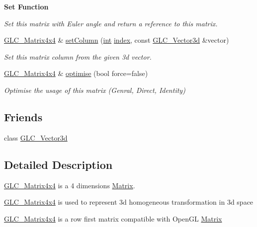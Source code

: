 \begin{Indent}{\bf Set Function}
\begin{DoxyCompactItemize}
\begin{DoxyCompactList}\small\item\em Set this matrix with Euler angle and return a reference to this matrix. \end{DoxyCompactList}\item 
\hyperlink{class_g_l_c___matrix4x4}{G\-L\-C\-\_\-\-Matrix4x4} \& \hyperlink{class_g_l_c___matrix4x4_ac3c938835da031e19b26eb27a5e436c1}{set\-Column} (\hyperlink{ioapi_8h_a787fa3cf048117ba7123753c1e74fcd6}{int} \hyperlink{glext_8h_ab47dd9958bcadea08866b42bf358e95e}{index}, const \hyperlink{class_g_l_c___vector3d}{G\-L\-C\-\_\-\-Vector3d} \&vector)
\begin{DoxyCompactList}\small\item\em Set this matrix column from the given 3d vector. \end{DoxyCompactList}\item 
\hyperlink{class_g_l_c___matrix4x4}{G\-L\-C\-\_\-\-Matrix4x4} \& \hyperlink{class_g_l_c___matrix4x4_a377e671a06f7863055f9d805402be411}{optimise} (bool force=false)
\begin{DoxyCompactList}\small\item\em Optimise the usage of this matrix (Genral, Direct, Identity) \end{DoxyCompactList}\end{DoxyCompactItemize}
\end{Indent}
\subsection*{Friends}
\begin{DoxyCompactItemize}
\item 
class \hyperlink{class_g_l_c___matrix4x4_a12e30aa3c4b9461968961178e9c38b10}{G\-L\-C\-\_\-\-Vector3d}
\end{DoxyCompactItemize}


\subsection{Detailed Description}
\hyperlink{class_g_l_c___matrix4x4}{G\-L\-C\-\_\-\-Matrix4x4} is a 4 dimensions \hyperlink{class_matrix}{Matrix}. 

\hyperlink{class_g_l_c___matrix4x4}{G\-L\-C\-\_\-\-Matrix4x4} is used to represent 3d homogeneous transformation in 3d space \par
 \hyperlink{class_g_l_c___matrix4x4}{G\-L\-C\-\_\-\-Matrix4x4} is a row first matrix compatible with Open\-G\-L \hyperlink{class_matrix}{Matrix} 

